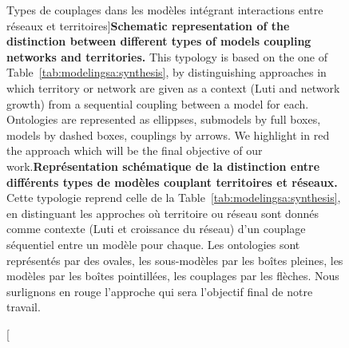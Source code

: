 \begin{figure}[h!]
\caption[Types of coupling in models integrating interactions between networks and territories][Types de couplages dans les modèles intégrant interactions entre réseaux et territoires]{\textbf{Schematic representation of the distinction between different types of models coupling networks and territories.} This typology is based on the one of Table~\ref{tab:modelingsa:synthesis}, by distinguishing approaches in which territory or network are given as a context (Luti and network growth) from a sequential coupling between a model for each. Ontologies are represented as ellippses, submodels by full boxes, models by dashed boxes, couplings by arrows. We highlight in red the approach which will be the final objective of our work.\label{fig:modelography:coevolution}}{\textbf{Représentation schématique de la distinction entre différents types de modèles couplant territoires et réseaux.} Cette typologie reprend celle de la Table~\ref{tab:modelingsa:synthesis}, en distinguant les approches où territoire ou réseau sont donnés comme contexte (Luti et croissance du réseau) d'un couplage séquentiel entre un modèle pour chaque. Les ontologies sont représentés par des ovales, les sous-modèles par les boîtes pleines, les modèles par les boîtes pointillées, les couplages par les flèches. Nous surlignons en rouge l'approche qui sera l'objectif final de notre travail.\label{fig:modelography:coevolution}}
\end{figure}




